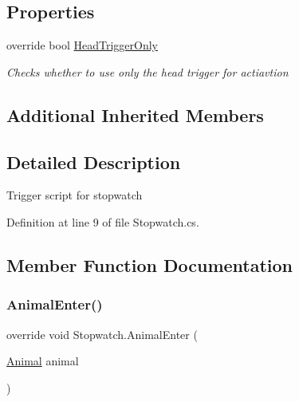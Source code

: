 \subsection*{Properties}
\begin{DoxyCompactItemize}
\item 
override bool \mbox{\hyperlink{class_stopwatch_ae64c783be2fb89590b292e86bded720a}{Head\+Trigger\+Only}}
\begin{DoxyCompactList}\small\item\em Checks whether to use only the head trigger for actiavtion \end{DoxyCompactList}\end{DoxyCompactItemize}
\subsection*{Additional Inherited Members}


\subsection{Detailed Description}
Trigger script for stopwatch 



Definition at line 9 of file Stopwatch.\+cs.



\subsection{Member Function Documentation}
\mbox{\label{class_stopwatch_abd930ea70de15bd24e05f63ba89a640e}} 
\subsubsection{\texorpdfstring{Animal\+Enter()}{AnimalEnter()}}
{\footnotesize\ttfamily override void Stopwatch.\+Animal\+Enter (\begin{DoxyParamCaption}\item[{\mbox{\hyperlink{class_animal}{Animal}}}]{animal }\end{DoxyParamCaption})\hspace{0.3cm}{\ttfamily [virtual]}}



